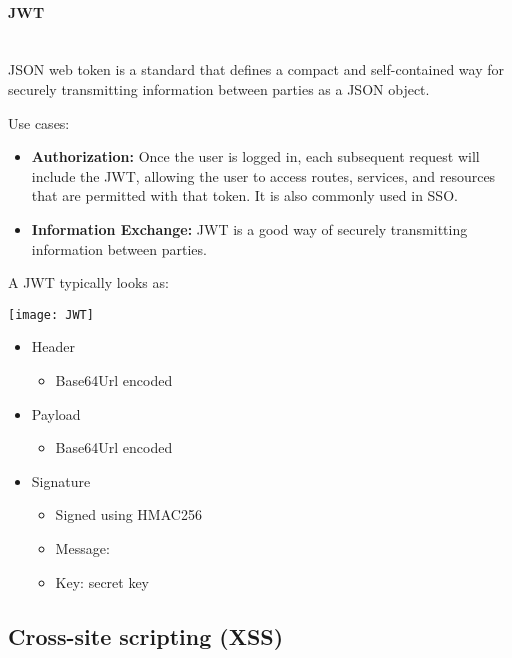 \documentclass[../ESOF_notes.tex]{subfiles}
\begin{document}
\paragraph{JWT} \mbox{}\\

JSON web token is a standard that defines a compact and self-contained way for securely transmitting information between parties as a JSON object.

Use cases:
\begin{itemize}
    \item \textbf{Authorization:} Once the user is logged in, each subsequent request will include the JWT, allowing the user to access routes, services, and resources that are permitted with that token. It is also commonly used in SSO.
    \item \textbf{Information Exchange:} JWT is a good way of securely transmitting information between parties.
\end{itemize}

A JWT typically looks as: 

\begin{center}
    \texttt{[image: JWT]}
\end{center}

\begin{itemize}
    \item Header
    \begin{itemize}
        \item Base64Url encoded
    \end{itemize}
    \item Payload
    \begin{itemize}
        \item Base64Url encoded
    \end{itemize}
    \item Signature
    \begin{itemize}
        \item Signed using HMAC256
        \item Message: 
        \item Key: secret key
    \end{itemize}
\end{itemize}

\subsection{Cross-site scripting (XSS)}
\end{document}
